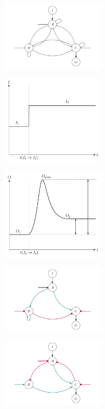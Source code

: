 \documentclass[varwidth=18cm, border=10pt]{standalone}
\begin{document}
\begin{figure}
\begin{subfigure}{6cm}
\centering\includegraphics[width=5cm]{../top_DrawGene_Net.pdf}
\caption{}
\end{subfigure}
\begin{subfigure}{6cm}
\centering\includegraphics[width=5cm]{../top_DrawGene_I.pdf}
\caption{}
\end{subfigure}
\begin{subfigure}{6cm}
\centering\includegraphics[width=5cm]{../top_DrawGene_O.pdf}
\caption{}
\end{subfigure}
\begin{subfigure}{6cm}
\centering\includegraphics[width=5cm]{ooompppompmom.pdf}
\caption{}
\end{subfigure}
\begin{subfigure}{6cm}
\centering\includegraphics[width=5cm]{oommpmoopppom.pdf}

\end{subfigure}
\end{figure}
\end{document}
